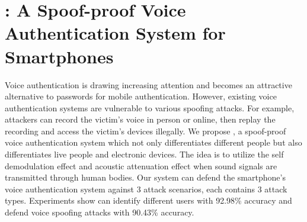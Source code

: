 \chapter{{\mv}: A Spoof-proof Voice Authentication System for Smartphones}

Voice authentication is drawing increasing attention and becomes an attractive alternative to passwords for mobile authentication. However, existing voice authentication systems are vulnerable to various spoofing attacks. For example, attackers can record the victim's voice in person or online, then replay the recording and access the victim's devices illegally. 
We propose \shortname, a spoof-proof voice authentication system which not only differentiates different people but also differentiates live people and electronic devices. The idea is to utilize the self demodulation effect and acoustic attenuation effect when sound signals are transmitted through human bodies. Our system can defend the smartphone's voice authentication system against 3 attack scenarios, each contains 3 attack types. Experiments show  {\shortname} can identify different users with 92.98\% accuracy and defend voice spoofing attacks with 90.43\% accuracy. 
















